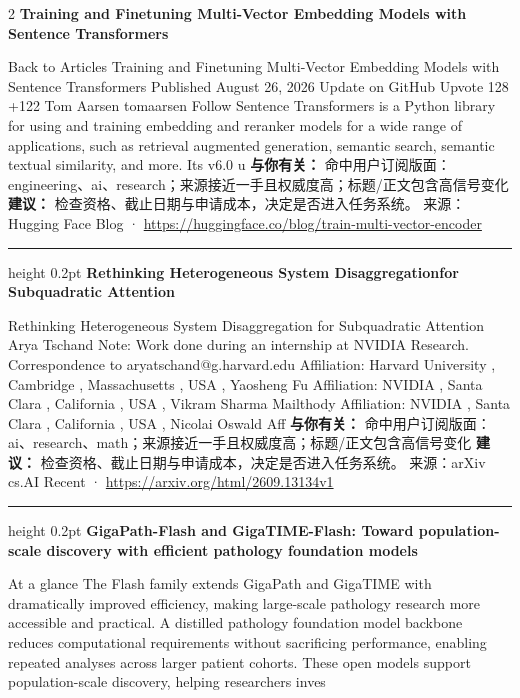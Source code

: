 \documentclass[10.5pt]{ctexart}
\begin{document}
\begin{multicols}{2}
{\large\bfseries Training and Finetuning Multi-Vector Embedding Models with Sentence Transformers}\par
Back to Articles Training and Finetuning Multi-Vector Embedding Models with Sentence Transformers Published August 26, 2026 Update on GitHub Upvote 128 +122 Tom Aarsen tomaarsen Follow Sentence Transformers is a Python library for using and training embedding and reranker models for a wide range of applications, such as retrieval augmented generation, semantic search, semantic textual similarity, and more. Its v6.0 u
\textbf{与你有关：} 命中用户订阅版面：engineering、ai、research；来源接近一手且权威度高；标题/正文包含高信号变化
\textbf{建议：} 检查资格、截止日期与申请成本，决定是否进入任务系统。
{\footnotesize\color{ormuted} 来源：Hugging Face Blog · \url{https://huggingface.co/blog/train-multi-vector-encoder}}
\vspace{2mm}
\hrule height 0.2pt
\vspace{2mm}
{\large\bfseries Rethinking Heterogeneous System Disaggregationfor Subquadratic Attention}\par
Rethinking Heterogeneous System Disaggregation for Subquadratic Attention Arya Tschand Note: Work done during an internship at NVIDIA Research. Correspondence to aryatschand@g.harvard.edu Affiliation: Harvard University , Cambridge , Massachusetts , USA , Yaosheng Fu Affiliation: NVIDIA , Santa Clara , California , USA , Vikram Sharma Mailthody Affiliation: NVIDIA , Santa Clara , California , USA , Nicolai Oswald Aff
\textbf{与你有关：} 命中用户订阅版面：ai、research、math；来源接近一手且权威度高；标题/正文包含高信号变化
\textbf{建议：} 检查资格、截止日期与申请成本，决定是否进入任务系统。
{\footnotesize\color{ormuted} 来源：arXiv cs.AI Recent · \url{https://arxiv.org/html/2609.13134v1}}
\vspace{2mm}
\hrule height 0.2pt
\vspace{2mm}
{\large\bfseries GigaPath-Flash and GigaTIME-Flash: Toward population-scale discovery with efficient pathology foundation models}\par
At a glance The Flash family extends GigaPath and GigaTIME with dramatically improved efficiency, making large-scale pathology research more accessible and practical. A distilled pathology foundation model backbone reduces computational requirements without sacrificing performance, enabling repeated analyses across larger patient cohorts. These open models support population-scale discovery, helping researchers inves

\end{multicols}
\end{document}
